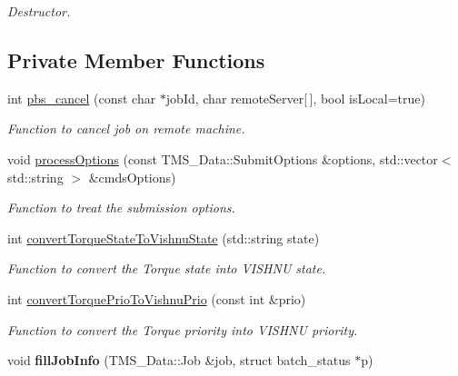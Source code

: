 \begin{DoxyCompactItemize}
\begin{DoxyCompactList}\small\item\em Destructor. \item\end{DoxyCompactList}\end{DoxyCompactItemize}
\subsection*{Private Member Functions}
\begin{DoxyCompactItemize}
\item 
int \hyperlink{classTorqueServer_a8f155d04ceea433de756c98225c053b8}{pbs\_\-cancel} (const char $\ast$jobId, char remoteServer\mbox{[}$\,$\mbox{]}, bool isLocal=true)
\begin{DoxyCompactList}\small\item\em Function to cancel job on remote machine. \item\end{DoxyCompactList}\item 
void \hyperlink{classTorqueServer_a71cd2623e75c3615f16766204f8ef37b}{processOptions} (const TMS\_\-Data::SubmitOptions \&options, std::vector$<$ std::string $>$ \&cmdsOptions)
\begin{DoxyCompactList}\small\item\em Function to treat the submission options. \item\end{DoxyCompactList}\item 
int \hyperlink{classTorqueServer_a5fb51c751187a2bd49598aee2b0e3b18}{convertTorqueStateToVishnuState} (std::string state)
\begin{DoxyCompactList}\small\item\em Function to convert the Torque state into VISHNU state. \item\end{DoxyCompactList}\item 
int \hyperlink{classTorqueServer_a2427d2d3c69cf28f779d22396383e4d4}{convertTorquePrioToVishnuPrio} (const int \&prio)
\begin{DoxyCompactList}\small\item\em Function to convert the Torque priority into VISHNU priority. \item\end{DoxyCompactList}\item 
\hypertarget{classTorqueServer_a0411b4c5d842efabc66e9a5db39cceba}{
void {\bfseries fillJobInfo} (TMS\_\-Data::Job \&job, struct batch\_\-status $\ast$p)}
\label{classTorqueServer_a0411b4c5d842efabc66e9a5db39cceba}

\end{DoxyCompactItemize}
